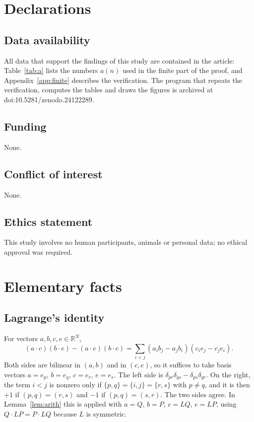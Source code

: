 \documentclass[11pt]{amsart}
\theoremstyle{definition}
\newcommand{\zenodoCodeDOI}{10.5281/zenodo.24122289}
\begin{document}
\section*{Declarations}

\subsection*{Data availability}
All data that support the findings of this study are contained in the article: Table~\ref{tab:a} lists the numbers $a(n)$ used in the finite part of the proof, and Appendix~\ref{app:finite} describes the verification. The program that repeats the verification, computes the tables and draws the figures is archived at doi:\zenodoCodeDOI.

\subsection*{Funding}
None.

\subsection*{Conflict of interest}
None.

\subsection*{Ethics statement}
This study involves no human participants, animals or personal data; no ethical approval was required.

\appendix

\section{Elementary facts}\label{app:standard}

\subsection*{Lagrange's identity}
For vectors $a,b,c,e\in\mathbb R^N$,
\[
(a\cdot c)(b\cdot e)-(a\cdot e)(b\cdot c)=\sum_{i<j}(a_ib_j-a_jb_i)(c_ie_j-c_je_i).
\]
Both sides are bilinear in $(a,b)$ and in $(c,e)$, so it suffices to take basis vectors $a=e_p$, $b=e_q$, $c=e_r$, $e=e_s$. The left side is $\delta_{pr}\delta_{qs}-\delta_{ps}\delta_{qr}$. On the right, the term $i<j$ is nonzero only if $\{p,q\}=\{i,j\}=\{r,s\}$ with $p\ne q$, and it is then $+1$ if $(p,q)=(r,s)$ and $-1$ if $(p,q)=(s,r)$. The two sides agree. In Lemma~\ref{lem:arith} this is applied with $a=Q$, $b=P$, $c=LQ$, $e=LP$, using $Q\cdot LP=P\cdot LQ$ because $L$ is symmetric.
\end{document}
